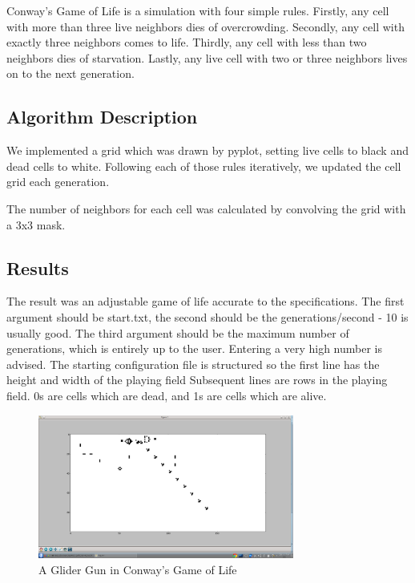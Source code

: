 Conway's Game of Life is a simulation with four simple rules.  Firstly, any cell with more than three live neighbors dies of overcrowding.  Secondly, any cell with exactly three neighbors comes to life.  Thirdly, any cell with less than two neighbors dies of starvation.  Lastly, any live cell with two or three neighbors lives on to the next generation.

\subsection{Algorithm Description}

We implemented a grid which was drawn by pyplot, setting live cells to black and dead cells to white.  Following each of those rules iteratively, we updated the cell grid each generation.  

The number of neighbors for each cell was calculated by convolving the grid with a 3x3 mask.

\subsection{Results}

The result was an adjustable game of life accurate to the specifications.   The first argument should be start.txt, the second should be the generations/second - 10 is usually good.  The third argument should be the maximum number of generations, which is entirely up to the user.  Entering a very high number is advised. The starting configuration file is structured so the first line has the height and width of the playing field Subsequent lines are rows in the playing field.  0s are cells which are dead, and 1s are cells which are alive.

\begin{figure}[tbh]
\begin{center}
\includegraphics[width=0.75\textwidth]{glidergun.png}
\end{center}
\caption{A Glider Gun in Conway's Game of Life\label{fig:gprun}}
\end{figure}
